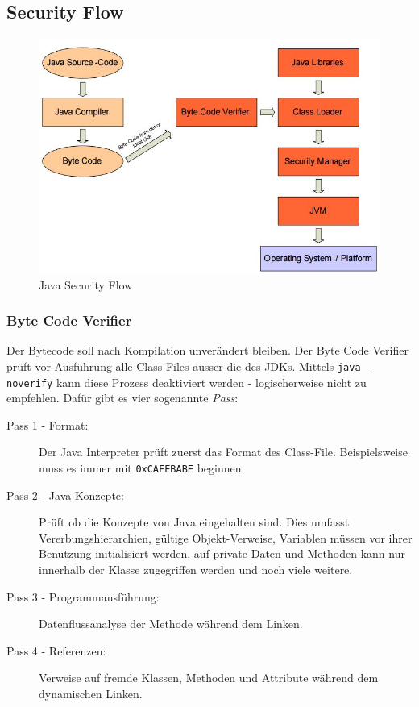 \subsection{Security Flow}
\begin{figure}[h!]
\centering
\includegraphics[width=0.5\linewidth]{fig/java-security-flow}
\caption{Java Security Flow}
\label{fig:java-security-flow}
\end{figure}

\subsubsection{Byte Code Verifier}
Der Bytecode soll nach Kompilation unverändert bleiben. Der Byte Code Verifier prüft vor Ausführung alle Class-Files ausser die des JDKs. Mittels \verb|java -noverify| kann diese Prozess deaktiviert werden - logischerweise nicht zu empfehlen. Dafür gibt es vier sogenannte \emph{Pass}:
\begin{description}
	\item[Pass 1 - Format:] Der Java Interpreter prüft zuerst das Format des Class-File. Beispielsweise muss es immer mit \verb|0xCAFEBABE| beginnen.
	
	\item[Pass 2 - Java-Konzepte:] Prüft ob  die Konzepte von Java eingehalten sind. Dies umfasst Vererbungshierarchien, gültige Objekt-Verweise, Variablen müssen vor ihrer Benutzung initialisiert werden, auf private Daten und Methoden kann nur innerhalb der Klasse zugegriffen werden und noch viele weitere.
	
	\item[Pass 3 - Programmausführung:] Datenflussanalyse der Methode während dem Linken.
	
	\item[Pass 4 - Referenzen:] Verweise auf fremde Klassen, Methoden und Attribute während dem dynamischen Linken.
\end{description}

